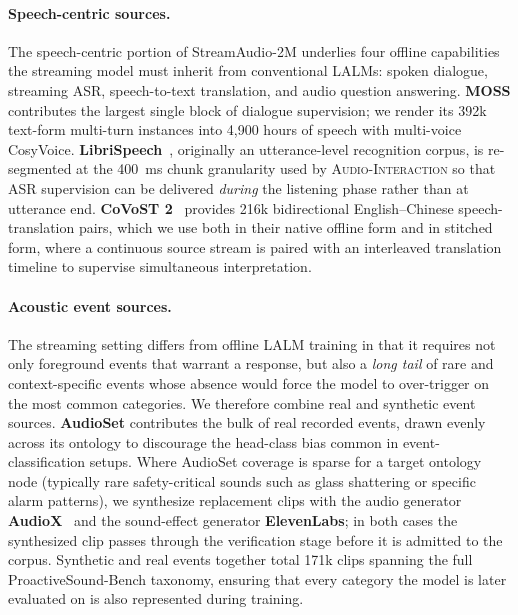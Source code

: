 \documentclass{llmxive}
\begin{document}
\paragraph{Speech-centric sources.}
The speech-centric portion of StreamAudio-2M underlies four offline capabilities the
streaming model must inherit from conventional LALMs: spoken dialogue, streaming ASR,
speech-to-text translation, and audio question answering. \textbf{MOSS}
contributes the largest single block of dialogue supervision; we render its 392k
text-form multi-turn instances into 4{,}900 hours of speech with multi-voice CosyVoice.
\textbf{LibriSpeech}~\citep{panayotov2015librispeech}, originally an utterance-level
recognition corpus, is re-segmented at the 400~ms chunk granularity used by \textsc{Audio-Interaction}
so that ASR supervision can be delivered \emph{during} the listening phase rather than at
utterance end. \textbf{CoVoST 2}~\citep{wang2021covost} provides 216k bidirectional
English--Chinese speech-translation pairs, which we use both in their native offline form
and in stitched form, where a continuous source stream is paired with an interleaved
translation timeline to supervise simultaneous interpretation.


\paragraph{Acoustic event sources.}
The streaming setting differs from offline LALM training in that it requires not only
foreground events that warrant a response, but also a \emph{long tail} of rare and
context-specific events whose absence would force the model to over-trigger on the most
common categories. We therefore combine real and synthetic event sources.
\textbf{AudioSet} contributes the bulk of real recorded events, drawn evenly across its
ontology to discourage the head-class bias common in event-classification setups. Where
AudioSet coverage is sparse for a target ontology node (typically rare safety-critical
sounds such as glass shattering or specific alarm patterns), we synthesize replacement
clips with the audio generator \textbf{AudioX}~\citep{tian2025audiox} and the
sound-effect generator \textbf{ElevenLabs}; in both cases the synthesized clip passes
through the verification stage  before it is
admitted to the corpus. Synthetic and real events together total 171k clips spanning the
full ProactiveSound-Bench taxonomy, ensuring that
every category the model is later evaluated on is also represented during training.
\end{document}
